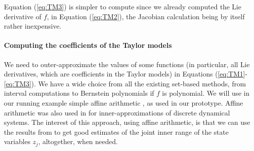 \documentclass{sig-alternate-05-2015} %
\newtheorem{remark}{Remark}
\begin{document}
Equation (\ref{eq:TM3}) 
is simpler to compute since we already computed
the Lie derivative of $f$, in Equation (\ref{eq:TM2}), the Jacobian calculation being by
itself rather 
inexpensive. 

\paragraph{Computing the coefficients of the Taylor models}

We need to outer-approximate the values of some functions (in particular, all Lie
derivatives, which are coefficients in the Taylor models) in Equations 
(\ref{eq:TM1}-\ref{eq:TM3}). We have a wide choice from all the existing set-based
methods, from interval computations to Bernstein polynomials \cite{Dang} if $f$
is polynomial. We will use in our running example simple affine arithmetic
\cite{com-sto-93-aa}, as used in our prototype. %
Affine arithmetic was also used in \cite{hscc14} for inner-approximations of
discrete dynamical systems. The interest of this approach, using affine arithmetic,
is that we can use the results from \cite{rc13} to get good estimates of the
joint inner range of the state variables $z_j$, altogether, when needed. 
\end{document}
